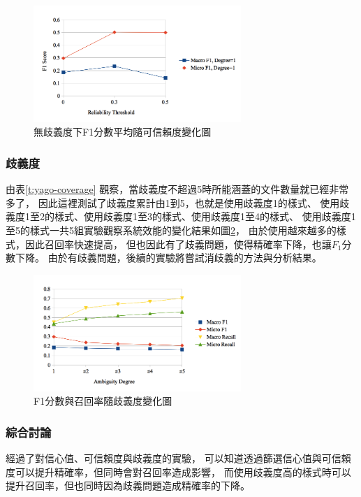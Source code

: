 \begin{figure}[h]
    \centering
    \includegraphics[width=0.7\textwidth]{images/04-reliability-f1}
    \caption{無歧義度下F1分數平均隨可信賴度變化圖}
    \label{i:reliability-f1}
\end{figure}



\subsubsection{歧義度}
由表\ref{t:yago-coverage} 觀察，當歧義度不超過5時所能涵蓋的文件數量就已經非常多了，
因此這裡測試了歧義度累計由1到5，也就是使用歧義度1的樣式、
使用歧義度1至2的樣式、使用歧義度1至3的樣式、使用歧義度1至4的樣式、
使用歧義度1至5的樣式一共5組實驗觀察系統效能的變化結果如圖\ref{i:degree}，
由於使用越來越多的樣式，因此召回率快速提高，
但也因此有了歧義問題，使得精確率下降，也讓$F_1$分數下降。
由於有歧義問題，後續的實驗將嘗試消歧義的方法與分析結果。

\begin{figure}[h]
    \centering
    \includegraphics[width=0.7\textwidth]{images/04-degree}
    \caption{F1分數與召回率隨歧義度變化圖}
    \label{i:degree}
\end{figure}

\subsubsection{綜合討論}
經過了對信心值、可信賴度與歧義度的實驗，
可以知道透過篩選信心值與可信賴度可以提升精確率，但同時會對召回率造成影響，
而使用歧義度高的樣式時可以提升召回率，但也同時因為歧義問題造成精確率的下降。

